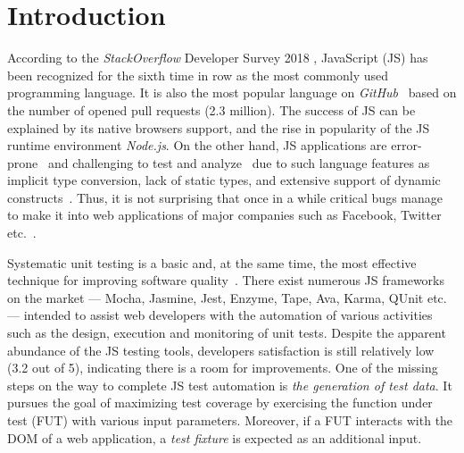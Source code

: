 \section{Introduction}
\label{sec.intro}

According to the \emph{StackOverflow} Developer Survey 2018 \cite{stackoverflow2018}, JavaScript (JS) has been recognized for the sixth time in row as the most commonly used programming language. It is also the most popular language on \emph{GitHub}~\cite{guthub2017} based on the number of opened pull requests (2.3 million). The success of JS can be explained by its native browsers support, and the rise in popularity of the JS runtime environment \emph{Node.js}. On the other hand, JS applications are error-prone~\cite{frolin:TSE16} and challenging to test and analyze~\cite{mesbah2015advances,andreasen2017survey,sun2017analysis} due to such language features as implicit type conversion, lack of static types, and extensive support of dynamic constructs~\cite{richards2010analysis}. Thus, it is not surprising that once in a while critical bugs manage to make it into web applications of major companies such as Facebook, Twitter etc.~\cite{bugstories2017}.

Systematic unit testing is a basic and, at the same time, the most effective technique for improving software quality~\cite{martin2009clean}. There exist numerous JS frameworks on the market
--- Mocha, Jasmine, Jest, Enzyme, Tape, Ava, Karma, QUnit etc. ---
intended to assist web developers with the automation of various  activities such as the design, execution and monitoring of unit tests. Despite the apparent abundance of the JS testing tools, developers satisfaction  is still relatively low~\cite{stateJS2017} (3.2 out of 5), indicating there is a room for improvements. One of the missing steps on the way to complete JS test automation is \emph{the generation of test data}. It pursues the goal of maximizing test coverage by exercising the function under test (FUT) with various input parameters. Moreover, if a FUT interacts with the DOM of a web application, a \emph{test fixture} is expected as an additional input.

